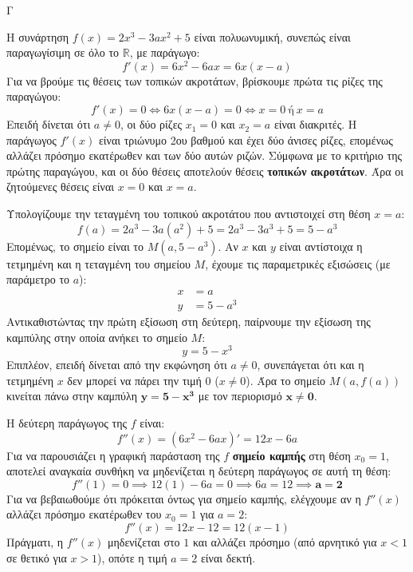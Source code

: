 \begin{thema}{Γ}
\begin{erwthma}
\item Η συνάρτηση $f(x) = 2x^3 - 3a x^2 + 5$ είναι πολυωνυμική, συνεπώς είναι παραγωγίσιμη σε όλο το $\mathbb{R}$, με παράγωγο:
\[ f'(x) = 6x^2 - 6ax = 6x(x-a) \]
Για να βρούμε τις θέσεις των τοπικών ακροτάτων, βρίσκουμε πρώτα τις ρίζες της παραγώγου:
\[ f'(x) = 0 \Leftrightarrow 6x(x-a) = 0 \Leftrightarrow x = 0 \ \text{ή} \ x = a \]
Επειδή δίνεται ότι $a \neq 0$, οι δύο ρίζες $x_1 = 0$ και $x_2 = a$ είναι διακριτές. 
Η παράγωγος $f'(x)$ είναι τριώνυμο 2ου βαθμού και έχει δύο άνισες ρίζες, επομένως αλλάζει πρόσημο εκατέρωθεν και των δύο αυτών ριζών. 
Σύμφωνα με το κριτήριο της πρώτης παραγώγου, και οι δύο θέσεις αποτελούν θέσεις \textbf{τοπικών ακροτάτων}. 
Άρα οι ζητούμενες θέσεις είναι $x = 0$ και $x = a$.

\item Υπολογίζουμε την τεταγμένη του τοπικού ακροτάτου που αντιστοιχεί στη θέση $x = a$:
\[ f(a) = 2a^3 - 3a(a^2) + 5 = 2a^3 - 3a^3 + 5 = 5 - a^3 \]
Επομένως, το σημείο είναι το $M(a, 5 - a^3)$.
Αν $x$ και $y$ είναι αντίστοιχα η τετμημένη και η τεταγμένη του σημείου $M$, έχουμε τις παραμετρικές εξισώσεις (με παράμετρο το $a$):
\begin{align*}
x &= a \\
y &= 5 - a^3
\end{align*}
Αντικαθιστώντας την πρώτη εξίσωση στη δεύτερη, παίρνουμε την εξίσωση της καμπύλης στην οποία ανήκει το σημείο $M$:
\[ y = 5 - x^3 \]
Επιπλέον, επειδή δίνεται από την εκφώνηση ότι $a \neq 0$, συνεπάγεται ότι και η τετμημένη $x$ δεν μπορεί να πάρει την τιμή 0 ($x \neq 0$).
Άρα το σημείο $M(a, f(a))$ κινείται πάνω στην καμπύλη $\boldsymbol{y = 5 - x^3}$ με τον περιορισμό $\boldsymbol{x \neq 0}$.

\item Η δεύτερη παράγωγος της $f$ είναι:
\[ f''(x) = (6x^2 - 6ax)' = 12x - 6a \]
Για να παρουσιάζει η γραφική παράσταση της $f$ \textbf{σημείο καμπής} στη θέση $x_0 = 1$, αποτελεί αναγκαία συνθήκη να μηδενίζεται η δεύτερη παράγωγος σε αυτή τη θέση:
\[ f''(1) = 0 \implies 12(1) - 6a = 0 \implies 6a = 12 \implies \boldsymbol{a = 2} \]
Για να βεβαιωθούμε ότι πρόκειται όντως για σημείο καμπής, ελέγχουμε αν η $f''(x)$ αλλάζει πρόσημο εκατέρωθεν του $x_0=1$ για $a=2$:
\[ f''(x) = 12x - 12 = 12(x-1) \]
Πράγματι, η $f''(x)$ μηδενίζεται στο $1$ και αλλάζει πρόσημο (από αρνητικό για $x<1$ σε θετικό για $x>1$), οπότε η τιμή $a=2$ είναι δεκτή.


\end{erwthma}
\end{thema}
